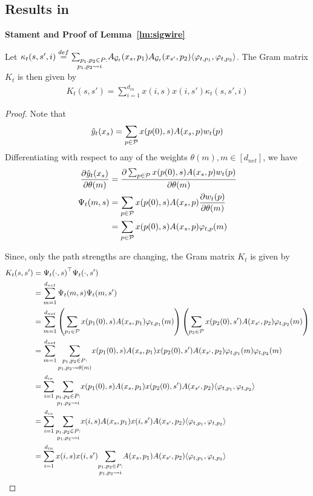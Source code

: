 \subsection{Results in }
\textbf{Stament and Proof of Lemma~\ref{lm:sigwire}}
\begin{lemma}
Let $\kappa_t(s,s',i)\stackrel{def}=\underset{p_1,p_2\rsa i}{\sum_{p_1,p_2\in P:}} A_{\G_t}(x_s,p_1) A_{\G_t}(x_{s'},p_2) \ip{\varphi_{t,p_1}, \varphi_{t,p_2}}$. The Gram matrix $K_t$ is then given by 
\begin{align}\label{eq:ktalg}
{K_t(s,s')}=\sum_{i=1}^{d_{in}} x(i,s)x(i,s') \kappa_t(s,s',i)
\end{align}
\end{lemma}

\begin{proof}
Note that
\begin{align*}
\hat{y}_{t}(x_s)=\sum_{p\in\P}x(p(0),s) A(x_s,p) w_t(p)
\end{align*}
Differentiating with respect to any of the weights $\theta(m),m\in[d_{net}]$, we have
\begin{align*}
\frac{\partial \hat{y}_{t}(x_s)}{\partial \theta(m)}&=\frac{\partial \sum_{p\in\P}x(p(0),s) A(x_s,p) w_t(p)}{\partial \theta(m)}\\
\Psi_t(m,s)&=\sum_{p\in\P}x(p(0),s) A(x_s,p) \frac{\partial w_t(p)}{\partial \theta(m)}\\
&=\sum_{p\in\P}x(p(0),s) A(x_s,p) \varphi_{t,p}(m)
\end{align*}

Since, only the path strengths are changing, the Gram matrix $K_t$ is given by 
\begin{align*}
K_t(s,s')&={\Psi_t(\cdot,s)}^\top \Psi_t(\cdot,s')\\
&=\sum_{m=1}^{d_{net}} \Psi_t(m,s) \Psi_t(m,s')\\
&=\sum_{m=1}^{d_{net}} \left(\sum_{p_1\in\P}x(p_1(0),s) A(x_s,p_1) \varphi_{t,p_1}(m)\right)\left(\sum_{p_2\in\P}x(p_2(0),s') A(x_{s'},p_2) \varphi_{t,p_2}(m)\right)\\
&=\sum_{m=1}^{d_{net}} \underset{p_1,p_2\rsa\theta(m)}{\sum_{p_1,p_2\in P:}} x(p_1(0),s) A(x_s,p_1)x(p_2(0),s') A(x_{s'},p_2) \varphi_{t,p_1}(m) \varphi_{t,p_2}(m)\\
&=\sum_{i=1}^{d_{in}}\underset{p_1,p_2\rsa i}{\sum_{p_1,p_2\in P:}} x(p_1(0),s) A(x_s,p_1)x(p_2(0),s') A(x_{s'},p_2) \ip{\varphi_{t,p_1}, \varphi_{t,p_2}}\\
&=\sum_{i=1}^{d_{in}}\underset{p_1,p_2\rsa i}{\sum_{p_1,p_2\in P:}} x(i,s) A(x_s,p_1)x(i,s') A(x_{s'},p_2) \ip{\varphi_{t,p_1}, \varphi_{t,p_2}}\\
&=\sum_{i=1}^{d_{in}} x(i,s)x(i,s') \underset{p_1,p_2\rsa i}{\sum_{p_1,p_2\in P:}} A(x_s,p_1) A(x_{s'},p_2) \ip{\varphi_{t,p_1}, \varphi_{t,p_2}}
\end{align*}
\end{proof}


